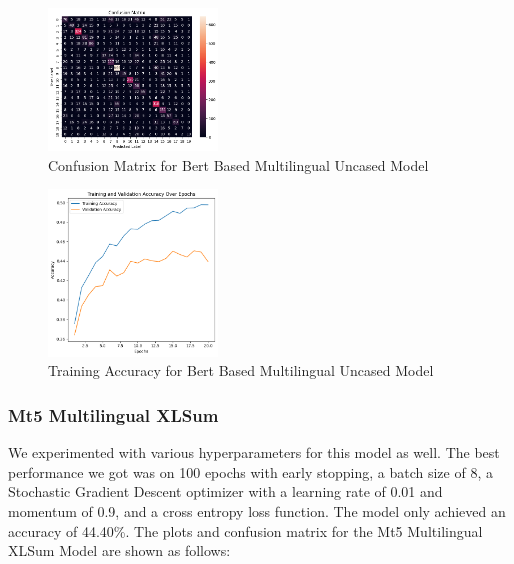 \begin{figure}[H]
    \centering
    \includegraphics[width=0.4\textwidth]{bbmu_confmat.png}
    \caption{Confusion Matrix for Bert Based Multilingual Uncased Model}
    \label{fig:bbmu_confmat}
\end{figure}

\begin{figure}[H]
    \centering
    \includegraphics[width=0.4\textwidth]{bbmu_trainaccuracy.png}
    \caption{Training Accuracy for Bert Based Multilingual Uncased Model}
    \label{fig:bbmu_trainaccuracy}
\end{figure}


\subsubsection{Mt5 Multilingual XLSum}
We experimented with various hyperparameters for this model as well. The best performance we got was on 100 epochs with early stopping, a batch size of 8, a Stochastic Gradient Descent optimizer with a learning rate of 0.01 and momentum of 0.9, and a cross entropy loss function. The model only achieved an accuracy of 44.40\%. The plots and confusion matrix for the Mt5 Multilingual XLSum Model are shown as follows:

